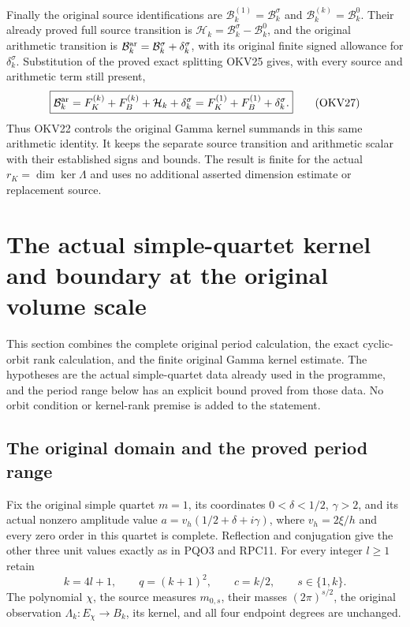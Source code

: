 \documentclass[11pt,a4paper]{article}
\begin{document}
Finally the original source identifications are
$\mathcal B_k^{(1)}=\mathcal B_k^\sigma$ and
$\mathcal B_k^{(k)}=\mathcal B_k^0$. Their already proved full
source transition is $\mathcal H_k=\mathcal B_k^\sigma-\mathcal B_k^0$,
and the original arithmetic transition is
$\mathcal B_k^{\rm ar}=\mathcal B_k^\sigma+\delta_k^\sigma$,
with its original finite signed allowance for $\delta_k^\sigma$.
Substitution of the proved exact splitting OKV25 gives, with every
source and arithmetic term still present,
\[
 \boxed{\mathcal B_k^{\rm ar}
   =F_K^{(k)}+F_B^{(k)}+\mathcal H_k+\delta_k^\sigma
   =F_K^{(1)}+F_B^{(1)}+\delta_k^\sigma.}
 \tag{OKV27}
\]
Thus OKV22 controls the original Gamma kernel summands in this
same arithmetic identity. It keeps the separate source transition
and arithmetic scalar with their established signs and bounds.
The result is finite for the actual $r_K=\dim\ker\Lambda$ and
uses no additional asserted dimension estimate or replacement source.



\section{The actual simple-quartet kernel and boundary at the original volume scale}
\label{sec:OMV}

This section combines the complete original period calculation,
the exact cyclic-orbit rank calculation, and the finite original
Gamma kernel estimate. The hypotheses are the actual simple-quartet
data already used in the programme, and the period range below has
an explicit bound proved from those data. No orbit condition or
kernel-rank premise is added to the statement.

\subsection{The original domain and the proved period range}
Fix the original simple quartet $m=1$, its coordinates
$0<\delta<1/2$, $\gamma>2$, and its actual nonzero amplitude value
$a=v_h(1/2+\delta+i\gamma)$, where $v_h=2\xi/h$ and every
zero order in this quartet is complete. Reflection and conjugation
give the other three unit values exactly as in PQO3 and RPC11.
For every integer $l\geq1$ retain
\[
 k=4l+1,\qquad q=(k+1)^2,\qquad c=k/2,
 \qquad s\in\{1,k\}.
 \tag{OMV1}
\]
The polynomial $\chi$, the source measures $m_{0,s}$, their masses
$(2\pi)^{s/2}$, the original observation $\Lambda_k:E_\chi\to B_k$,
its kernel, and all four endpoint degrees are unchanged.
\end{document}
